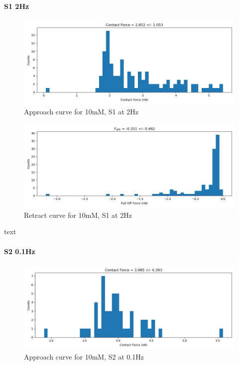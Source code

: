 \paragraph{S1 2Hz}
\begin{figure}[h!]
\centering
\includegraphics[width=\textwidth]{chapter7/Tip speed/10mM/S1 2Hz/approach_f_c_hist.jpg}
\caption{Approach curve for 10mM, S1 at 2Hz}
\end{figure}

\begin{figure}[h!]
\centering
\includegraphics[width=\textwidth]{chapter7/Tip speed/10mM/S1 2Hz/retract_f_a_hist.jpg}
\caption{Retract curve for 10mM, S1 at 2Hz}
\end{figure}
text
\newpage

\paragraph{S2 0.1Hz}
\begin{figure}[h!]
\centering
\includegraphics[width=\textwidth]{chapter7/Tip speed/10mM/S2 0.1Hz/approach_f_c_hist.jpg}
\caption{Approach curve for 10mM, S2 at 0.1Hz}
\end{figure}

